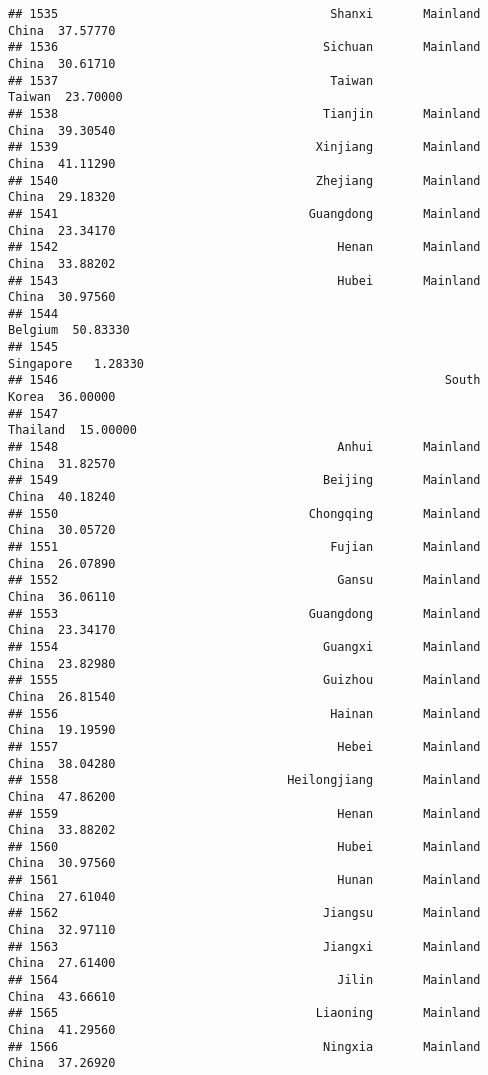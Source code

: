 \documentclass[
]{article}
\begin{document}
\begin{verbatim}
## 1535                                      Shanxi       Mainland China  37.57770
## 1536                                     Sichuan       Mainland China  30.61710
## 1537                                      Taiwan               Taiwan  23.70000
## 1538                                     Tianjin       Mainland China  39.30540
## 1539                                    Xinjiang       Mainland China  41.11290
## 1540                                    Zhejiang       Mainland China  29.18320
## 1541                                   Guangdong       Mainland China  23.34170
## 1542                                       Henan       Mainland China  33.88202
## 1543                                       Hubei       Mainland China  30.97560
## 1544                                                          Belgium  50.83330
## 1545                                                        Singapore   1.28330
## 1546                                                      South Korea  36.00000
## 1547                                                         Thailand  15.00000
## 1548                                       Anhui       Mainland China  31.82570
## 1549                                     Beijing       Mainland China  40.18240
## 1550                                   Chongqing       Mainland China  30.05720
## 1551                                      Fujian       Mainland China  26.07890
## 1552                                       Gansu       Mainland China  36.06110
## 1553                                   Guangdong       Mainland China  23.34170
## 1554                                     Guangxi       Mainland China  23.82980
## 1555                                     Guizhou       Mainland China  26.81540
## 1556                                      Hainan       Mainland China  19.19590
## 1557                                       Hebei       Mainland China  38.04280
## 1558                                Heilongjiang       Mainland China  47.86200
## 1559                                       Henan       Mainland China  33.88202
## 1560                                       Hubei       Mainland China  30.97560
## 1561                                       Hunan       Mainland China  27.61040
## 1562                                     Jiangsu       Mainland China  32.97110
## 1563                                     Jiangxi       Mainland China  27.61400
## 1564                                       Jilin       Mainland China  43.66610
## 1565                                    Liaoning       Mainland China  41.29560
## 1566                                     Ningxia       Mainland China  37.26920

\end{verbatim}
\end{document}
